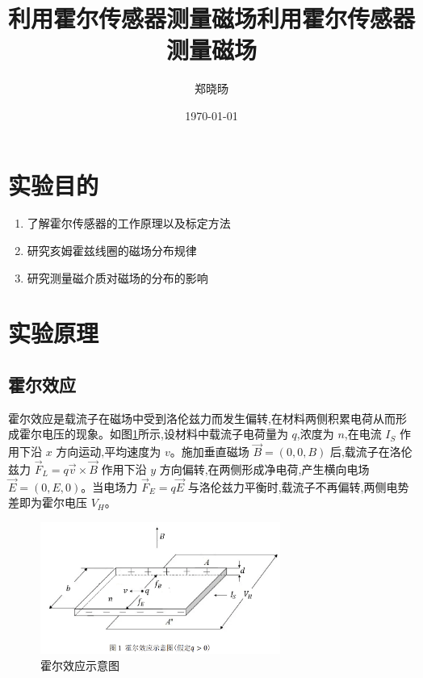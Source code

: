 \documentclass[UTF8]{ctexart}
\title{利用霍尔传感器测量磁场}
\title{利用霍尔传感器测量磁场}
\author{郑晓旸}
\date{\today}
\begin{document}
\fancyfoot[C]{\thepage}

\maketitle
\tableofcontents
\newpage

\section{实验目的}
    \begin{enumerate}
        \item 了解霍尔传感器的工作原理以及标定方法
        \item 研究亥姆霍兹线圈的磁场分布规律 
        \item 研究测量磁介质对磁场的分布的影响
    \end{enumerate}



\section{实验原理}

    \subsection{霍尔效应}
    
    霍尔效应是载流子在磁场中受到洛伦兹力而发生偏转,在材料两侧积累电荷从而形成霍尔电压的现象。如图\ref{fig:hall_effect}所示,设材料中载流子电荷量为 $q$,浓度为 $n$,在电流 $I_S$ 作用下沿 $x$ 方向运动,平均速度为 $v$。施加垂直磁场 $\vec{B}=(0,0,B)$ 后,载流子在洛伦兹力 $\vec{F}_L=q\vec{v}\times\vec{B}$ 作用下沿 $y$ 方向偏转,在两侧形成净电荷,产生横向电场 $\vec{E}=(0,E,0)$。当电场力 $\vec{F}_E=q\vec{E}$ 与洛伦兹力平衡时,载流子不再偏转,两侧电势差即为霍尔电压 $V_H$。
    
    \begin{figure}[htbp]
    \centering
    \includegraphics[width=0.7\textwidth]{hall_effect.png}
    \caption{霍尔效应示意图}
    \label{fig:hall_effect}
    \end{figure}
    
\end{document}
